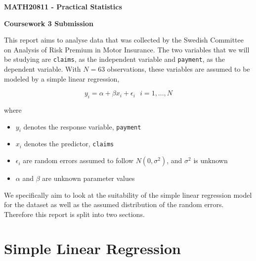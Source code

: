 \documentclass[11pt,a4]{article}
\begin{document}
	
\begin{center}
	\bf{\Large{MATH20811 - Practical Statistics}} 
	\bigskip
	\bigskip
	
		\bf{\Large{Coursework 3 Submission}} 
\end{center}	

\bigskip
\bigskip
	
This report aims to analyse data that was collected by the Swedish Committee on Analysis of Risk Premium in Motor Insurance. The two variables that we will be studying are \verb|claims|, as the independent variable and \verb|payment|, as the dependent variable. With $N = 63$ observations, these variables are assumed to be modeled by a simple linear regression,

\[ y_{i} = \alpha + \beta x_{i} + \epsilon_{i} \:\:\: i = 1,...,N\]
	
where
\begin{itemize}
    \item $y_{i}$ denotes the response variable, \verb|payment| 
    \item $x_{i}$ denotes the predictor, \verb|claims|
    \item $\epsilon_{i}$ are random errors assumed to follow $N(0,\sigma^2)$, and $\sigma^2$ is unknown
    \item $\alpha$ and $\beta$ are unknown parameter values
\end{itemize}

We specifically aim to look at the suitability of the simple linear regression model for the dataset as well as the assumed distribution of the random errors. Therefore this report is split into two sections.

\section{Simple Linear Regression}
\end{document}
